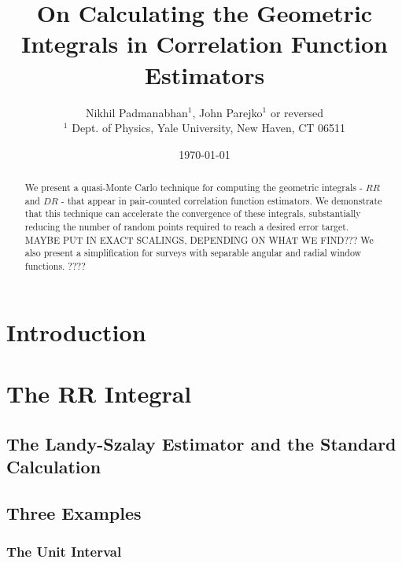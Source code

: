 \documentclass[usenatbib]{mn2e}
\begin{document}
\topmargin-1cm

\newcommand{\bd}{{\bm \delta}}


\title[Geometric Integrals for Correlation Functions]
{On Calculating the Geometric Integrals in Correlation Function Estimators}
\author[Padmanabhan\&Parejko]{Nikhil Padmanabhan$^{1}$, John Parejko$^{1}$ or
reversed \\
$^{1}$ Dept. of Physics, Yale University, New Haven, CT 06511 \\
}

\date{\today}
\maketitle

\begin{abstract}
  We present a quasi-Monte Carlo technique for computing the geometric integrals - $RR$ and $DR$ - that appear
  in pair-counted correlation function estimators. We demonstrate that this technique can accelerate the convergence of
  these integrals, substantially reducing the number of random points required
  to reach a desired error target. MAYBE PUT IN EXACT SCALINGS, DEPENDING ON
  WHAT WE FIND??? We also present a simplification for surveys with separable
  angular and radial window functions. ????
\end{abstract}

\section{Introduction}

\section{The RR Integral}

\subsection{The Landy-Szalay Estimator and the Standard Calculation}

\subsection{Three Examples}

\subsubsection{The Unit Interval}
\end{document}
